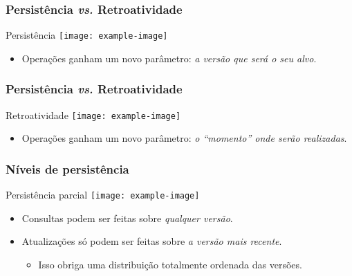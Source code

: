     \begin{frame}
        \frametitle{Persistência {\em vs.} Retroatividade}
        
        \begin{block}{Persistência}
            \centering
            \texttt{[image: example-image]}
        \end{block}
        
        \begin{itemize}
            \item Operações ganham um novo parâmetro: {\em a versão que será o seu alvo}.
        \end{itemize}

    \end{frame}

    \begin{frame}
        \frametitle{Persistência {\em vs.} Retroatividade}
        
        \begin{block}{Retroatividade}
            \centering
            \texttt{[image: example-image]}
        \end{block}
        
        \begin{itemize}
            \item Operações ganham um novo parâmetro: {\em o ``momento'' onde serão realizadas}.
        \end{itemize}

    \end{frame}


    \begin{frame}
        \frametitle{Níveis de persistência}

        \begin{block}{Persistência parcial}
            \centering
            \texttt{[image: example-image]}
        \end{block}

        \begin{itemize}
            \item<1-> Consultas podem ser feitas sobre {\em qualquer versão}.
            \item<2-> Atualizações só podem ser feitas sobre {\em a versão mais recente}.
            \begin{itemize}
                \item<3-> Isso obriga uma distribuição totalmente ordenada das versões.
            \end{itemize}
        \end{itemize}

    \end{frame}

